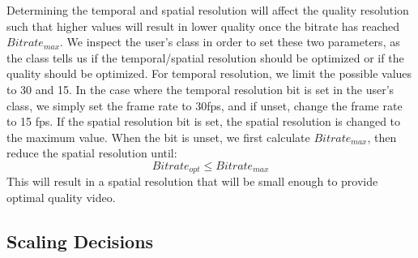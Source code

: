 \documentclass[a4paper,12pt]{article}
\begin{document}
Determining the temporal and spatial resolution will affect the quality resolution such that higher values will result in lower quality once the bitrate has reached $Bitrate_{max}$. We inspect the user’s class in order to set these two parameters, as the class tells us if the temporal/spatial resolution should be optimized or if the quality should be optimized. For temporal resolution, we limit the possible values to 30 and 15. In the case where the temporal resolution bit is set in the user’s class, we simply set the frame rate to 30fps, and if unset, change the frame rate to 15 fps. If the spatial resolution bit is set, the spatial resolution is changed to the maximum value. When the bit is unset, we first calculate $Bitrate_{max}$, then reduce the spatial resolution until:
\begin{equation}
\label{equ:OptMaxRelation}
Bitrate_{opt} \le Bitrate_{max}
\end{equation}
This will result in a spatial resolution that will be small enough to provide optimal quality video.

\subsection{Scaling Decisions}
\end{document}
